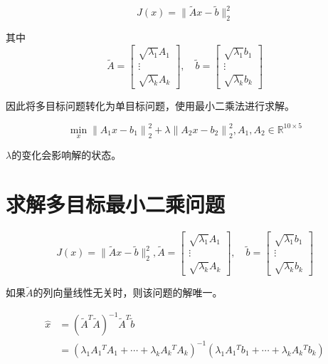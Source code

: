 \begin{problem}[加权最小二乘法问题矩阵形式]

    $$ J(x)=\|\tilde{A} x-\tilde{b}\|_{2}^{2} $$

其中
$$
\tilde{A}=\left[\begin{array}{c}
\sqrt{\lambda_{1}} A_{1} \\
\vdots \\
\sqrt{\lambda_{k}} A_{k}
\end{array}\right], \quad \tilde{b}=\left[\begin{array}{c}
\sqrt{\lambda_{1}} b_{1} \\
\vdots \\
\sqrt{\lambda_{k}} b_{k}
\end{array}\right]
$$
\end{problem}


因此将多目标问题转化为单目标问题，使用最小二乘法进行求解。

\begin{problem}[双目标规划问题]
    $$ \min _{x}\left\|A_{1} x-b_{1}\right\|_{2}^{2}+\lambda\left\|A_{2} x-b_{2}\right\|_{2}^{2}, A_{1}, A_{2} \in \mathbb{R}^{10 \times 5} $$

    $\lambda$的变化会影响解的状态。
\end{problem}


\section{求解多目标最小二乘问题}

\begin{problem}
    $$
    J(x)=\|\tilde{A} x-\tilde{b}\|_{2}^{2},
\tilde{A}=\left[\begin{array}{c}
\sqrt{\lambda_{1}} A_{1} \\
\vdots \\
\sqrt{\lambda_{k}} A_{k}
\end{array}\right], \quad \tilde{b}=\left[\begin{array}{c}
\sqrt{\lambda_{1}} b_{1} \\
\vdots \\
\sqrt{\lambda_{k}} b_{k}
\end{array}\right]
$$

\end{problem}

\begin{theorem}
    如果$\tilde{A}$的列向量线性无关时，则该问题的解唯一。

$$\begin{aligned} \hat{x}&=\left(\tilde{A}^{T} \tilde{A}\right)^{-1} \tilde{A}^{T} \tilde{b} \\
&= \left(\lambda_{1} A_{1}{ }^{T} A_{1}+\cdots+\lambda_{k} A_{k}{ }^{T} A_{k}\right)^{-1}\left(\lambda_{1} A_{1}{ }^{T} b_{1}+\cdots+\lambda_{k} A_{k}{ }^{T} b_{k}\right) \end{aligned} $$
\end{theorem}



